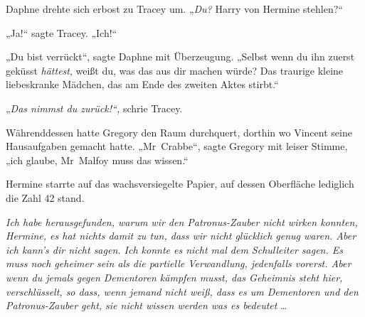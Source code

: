 Daphne drehte sich erbost zu Tracey um.
„\emph{Du?} Harry von Hermine stehlen?“

„Ja!“ sagte Tracey.
„Ich!“

„Du bist verrückt“, sagte Daphne mit Überzeugung.
„Selbst wenn du ihn zuerst geküsst \emph{hättest}, weißt du, was das aus dir machen würde? Das traurige kleine liebeskranke Mädchen, das am Ende des zweiten Aktes stirbt.“

„\emph{Das nimmst du zurück!“,} schrie Tracey.

Währenddessen hatte Gregory den Raum durchquert, dorthin wo Vincent seine Hausaufgaben gemacht hatte.
„Mr~Crabbe“, sagte Gregory mit leiser Stimme, „ich glaube, Mr~Malfoy muss das wissen.“


Hermine starrte auf das wachsversiegelte Papier, auf dessen Oberfläche lediglich die Zahl 42 stand.

\emph{Ich habe herausgefunden, warum wir den Patronus-Zauber nicht wirken konnten, Hermine, es hat nichts damit zu tun, dass wir nicht glücklich genug waren. Aber ich kann’s dir nicht sagen. Ich konnte es nicht mal dem Schulleiter sagen. Es muss noch geheimer sein als die partielle Verwandlung, jedenfalls vorerst. Aber wenn du jemals gegen Dementoren kämpfen musst, das Geheimnis steht hier, verschlüsselt, so dass, wenn jemand nicht weiß, dass es um Dementoren und den Patronus-Zauber geht, sie nicht wissen werden was es bedeutet} …

